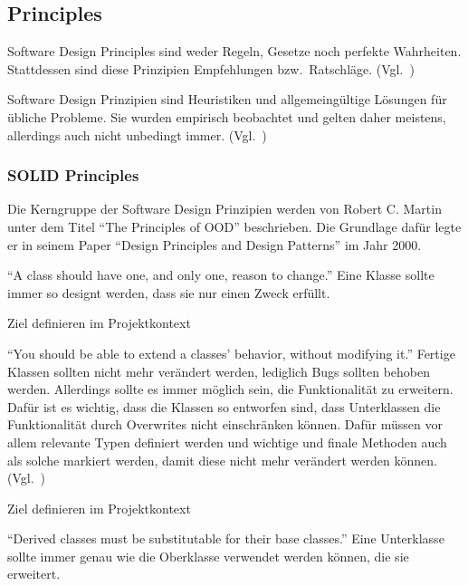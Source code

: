 \subsection{Principles}
Software Design Principles sind weder Regeln, Gesetze noch perfekte Wahrheiten.
Stattdessen sind diese Prinzipien Empfehlungen bzw.\ Ratschläge.
(Vgl.~\cite{getting-a-solid-start})

Software Design Prinzipien sind Heuristiken und allgemeingültige Lösungen für übliche Probleme.
Sie wurden empirisch beobachtet und gelten daher meistens, allerdings auch nicht unbedingt immer.
(Vgl.~\cite{getting-a-solid-start})

\subsubsection{SOLID Principles}
Die Kerngruppe der Software Design Prinzipien werden von Robert C. Martin unter dem Titel \enquote{The Principles of OOD}\cite{solid} beschrieben.
Die Grundlage dafür legte er in seinem Paper \enquote{Design Principles and Design Patterns}\cite{design-principles-and-design-patterns} im Jahr 2000.

\enquote{A class should have one, and only one, reason to change.}\cite{solid}
Eine Klasse sollte immer so designt werden, dass sie nur einen Zweck erfüllt\cite{different-types-of-software-design-principles}.

\color{red}
Ziel definieren im Projektkontext
\color{black}

\enquote{You should be able to extend a classes' behavior, without modifying it.}\cite{solid}
Fertige Klassen sollten nicht mehr verändert werden, lediglich Bugs sollten behoben werden.
Allerdings sollte es immer möglich sein, die Funktionalität zu erweitern.
Dafür ist es wichtig, dass die Klassen so entworfen sind, dass Unterklassen die Funktionalität durch Overwrites nicht einschränken können.
Dafür müssen vor allem relevante Typen definiert werden und wichtige und finale Methoden auch als solche markiert werden, damit diese nicht mehr verändert werden können.
(Vgl.~\cite{different-types-of-software-design-principles})

\color{red}
Ziel definieren im Projektkontext
\color{black}

\newpage

\enquote{Derived classes must be substitutable for their base classes.}\cite{solid}
Eine Unterklasse sollte immer genau wie die Oberklasse verwendet werden können, die sie erweitert\cite{different-types-of-software-design-principles}.

